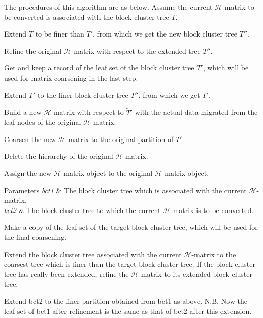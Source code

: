 The procedures of this algorithm are as below. Assume the current $\mathcal{H}$-\/matrix to be converted is associated with the block cluster tree $T$.


\begin{DoxyEnumerate}
\item Extend $T$ to be finer than $T'$, from which we get the new block cluster tree $T''$.
\item Refine the original $\mathcal{H}$-\/matrix with respect to the extended tree $T''$.
\item Get and keep a record of the leaf set of the block cluster tree $T'$, which will be used for matrix coarsening in the last step.
\item Extend $T'$ to the finer block cluster tree $T''$, from which we get $\tilde{T}'$.
\item Build a new $\mathcal{H}$-\/matrix with respect to $\tilde{T}'$ with the actual data migrated from the leaf nodes of the original $\mathcal{H}$-\/matrix.
\item Coarsen the new $\mathcal{H}$-\/matrix to the original partition of $T'$.
\item Delete the hierarchy of the original $\mathcal{H}$-\/matrix.
\item Assign the new $\mathcal{H}$-\/matrix object to the original $\mathcal{H}$-\/matrix object.
\end{DoxyEnumerate}


\begin{DoxyParams}{Parameters}
{\em bct1} & The block cluster tree which is associated with the current $\mathcal{H}$-\/matrix. \\
\hline
{\em bct2} & The block cluster tree to which the current $\mathcal{H}$-\/matrix is to be converted. \\
\hline
\end{DoxyParams}
Make a copy of the leaf set of the target block cluster tree, which will be used for the final coarsening.

Extend the block cluster tree associated with the current $\mathcal{H}$-\/matrix to the coarsest tree which is finer than the target block cluster tree. If the block cluster tree has really been extended, refine the $\mathcal{H}$-\/matrix to its extended block cluster tree.

Extend {\ttfamily bct2} to the finer partition obtained from {\ttfamily bct1} as above. N.\+B. Now the leaf set of {\ttfamily bct1} after refinement is the same as that of {\ttfamily bct2} after this extension.

